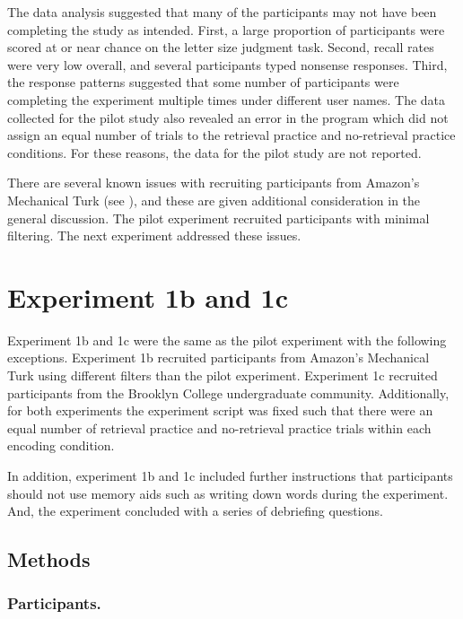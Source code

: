 \documentclass[
  man,floatsintext]{apa6}
\begin{document}
The data analysis suggested that many of the participants may not have been completing the study as intended. First, a large proportion of participants were scored at or near chance on the letter size judgment task. Second, recall rates were very low overall, and several participants typed nonsense responses. Third, the response patterns suggested that some number of participants were completing the experiment multiple times under different user names. The data collected for the pilot study also revealed an error in the program which did not assign an equal number of trials to the retrieval practice and no-retrieval practice conditions. For these reasons, the data for the pilot study are not reported.

There are several known issues with recruiting participants from Amazon's Mechanical Turk (see ), and these are given additional consideration in the general discussion. The pilot experiment recruited participants with minimal filtering. The next experiment addressed these issues.

\hypertarget{experiment-1b-and-1c}{%
\section{Experiment 1b and 1c}\label{experiment-1b-and-1c}}

Experiment 1b and 1c were the same as the pilot experiment with the following exceptions. Experiment 1b recruited participants from Amazon's Mechanical Turk using different filters than the pilot experiment. Experiment 1c recruited participants from the Brooklyn College undergraduate community. Additionally, for both experiments the experiment script was fixed such that there were an equal number of retrieval practice and no-retrieval practice trials within each encoding condition.

In addition, experiment 1b and 1c included further instructions that participants should not use memory aids such as writing down words during the experiment. And, the experiment concluded with a series of debriefing questions.

\hypertarget{methods-1}{%
\subsection{Methods}\label{methods-1}}

\hypertarget{participants.-1}{%
\subsubsection{Participants.}\label{participants.-1}}
\end{document}
